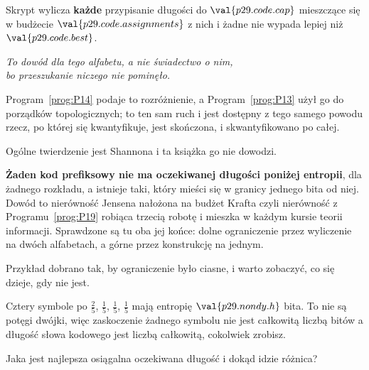 \begin{fr}

Skrypt wylicza \textbf{każde} przypisanie długości do
$\val{p29.code.cap}$ mieszczące się w budżecie \dash{}
$\val{p29.code.assignments}$ z nich \dash{} i żadne nie wypada lepiej niż
$\val{p29.code.best}$.

\begin{center}
\emph{To dowód dla tego alfabetu, a nie świadectwo o nim,\\
bo przeszukanie niczego nie pominęło.}
\end{center}

Program~\ref{prog:P14} podaje to rozróżnienie, a Program~\ref{prog:P13} użył
go do porządków topologicznych; to ten sam ruch i jest dostępny z tego samego
powodu \dash{} rzecz, po której się kwantyfikuje, jest skończona, i
skwantyfikowano po całej.

Ogólne twierdzenie jest Shannona i ta książka go nie dowodzi.

\begin{rigourbox}
\textbf{Żaden kod prefiksowy nie ma oczekiwanej długości poniżej entropii},
dla żadnego rozkładu, a istnieje taki, który mieści się w granicy jednego bita
od niej. Dowód to nierówność Jensena nałożona na budżet Krafta \dash{} czyli
nierówność z Programu~\ref{prog:P19} robiąca trzecią robotę \dash{} i mieszka
w każdym kursie teorii informacji. Sprawdzone są tu oba jej końce: dolne
ograniczenie przez wyliczenie na dwóch alfabetach, a górne przez konstrukcję
na jednym.
\end{rigourbox}
\end{fr}

\begin{fr}
Przykład dobrano tak, by ograniczenie było ciasne, i warto zobaczyć, co się
dzieje, gdy nie jest.

Cztery symbole po $\frac{2}{5}$, $\frac{1}{5}$, $\frac{1}{5}$, $\frac{1}{5}$
mają entropię $\val{p29.nondy.h}$ bita. To nie są potęgi dwójki, więc
zaskoczenie żadnego symbolu nie jest całkowitą liczbą bitów \dash{} a długość
słowa kodowego jest liczbą całkowitą, cokolwiek zrobisz.

Jaka jest najlepsza osiągalna oczekiwana długość i dokąd idzie różnica?
\dotline
\nextframe
\end{fr}

